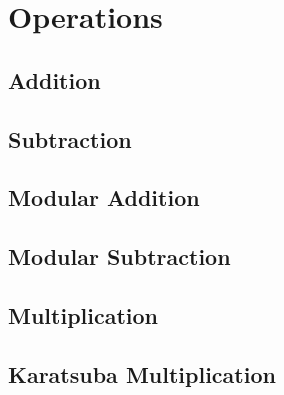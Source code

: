 \documentclass[10pt, a4paper]{report}
\begin{document}
\section{Operations}
\subsection{Addition}
\subsection{Subtraction}
\subsection{Modular Addition}
\subsection{Modular Subtraction}
\subsection{Multiplication}
\subsection{Karatsuba Multiplication}

%
%
%
\end{document}
